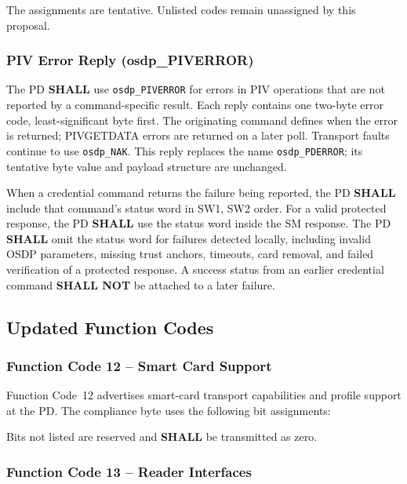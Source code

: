 The assignments are tentative. Unlisted codes remain unassigned by this proposal.

\subsubsection{PIV Error Reply (osdp\_PIVERROR)}\label{sec:piverror}

The PD \textbf{SHALL} use \texttt{osdp\_PIVERROR} for errors in PIV operations
that are not reported by a command-specific result. Each reply contains one
two-byte error code, least-significant byte first. The originating command
defines when the error is returned; PIVGETDATA errors are returned on a later poll.
Transport faults continue to use \texttt{osdp\_NAK}.
This reply replaces the name \texttt{osdp\_PDERROR}; its tentative byte value
 and payload structure are unchanged.



When a credential command returns the failure being reported, the PD \textbf{SHALL}
include that command's status word in SW1, SW2 order. For a valid protected
response, the PD \textbf{SHALL} use the status word inside the SM response.
The PD \textbf{SHALL} omit the status word for failures detected locally,
including invalid OSDP parameters, missing trust anchors, timeouts, card
removal, and failed verification of a protected response. A success status
from an earlier credential command \textbf{SHALL NOT} be attached to a later failure.

\subsection{Updated Function Codes}

\subsubsection{Function Code 12 – Smart Card Support}

Function Code~12 advertises smart-card transport capabilities and profile support at the PD. The compliance byte uses the following bit assignments:



Bits not listed are reserved and \textbf{SHALL} be transmitted as zero.

\subsubsection{Function Code 13 – Reader Interfaces}

